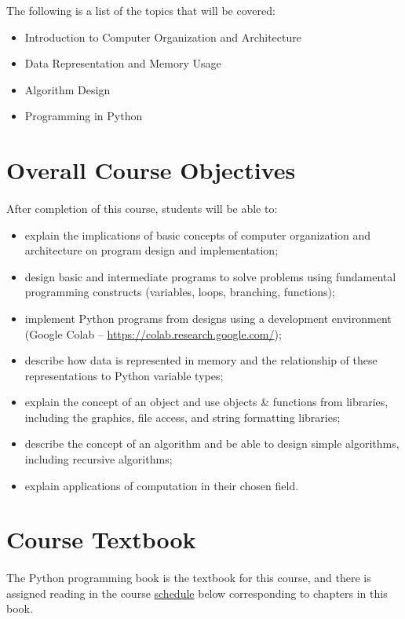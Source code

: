 \documentclass[letter,10pt]{article}
\begin{document}
The following is a list of the topics that will be covered:
\begin{itemize}
\item Introduction to Computer Organization and Architecture
\item Data Representation and Memory Usage
\item Algorithm Design
\item Programming in Python
\end{itemize}

\section*{Overall Course Objectives}
\paragraph{}After completion of this course, students will be able to:
\begin{itemize}
    \item explain the implications of basic concepts of computer organization and architecture on program design and implementation;
    \item design basic and intermediate programs to solve problems using fundamental programming constructs (variables, loops, branching, functions);
    \item implement Python programs from designs using a development environment (Google Colab -- \url{https://colab.research.google.com/});
    \item describe how data is represented in memory and the relationship of these representations to Python variable types;
    \item explain the concept of an object and use objects \& functions from libraries, including the graphics, file access, and string formatting libraries;
    \item describe the concept of an algorithm and be able to design simple algorithms, including recursive algorithms;
    \item explain applications of computation in their chosen field.
\end{itemize}

\section*{Course Textbook}
\paragraph{}The Python programming book is the textbook for this course, and there is assigned reading in the course \hyperlink{sec:sechedule}{schedule} below corresponding to chapters in this book.
\end{document}
